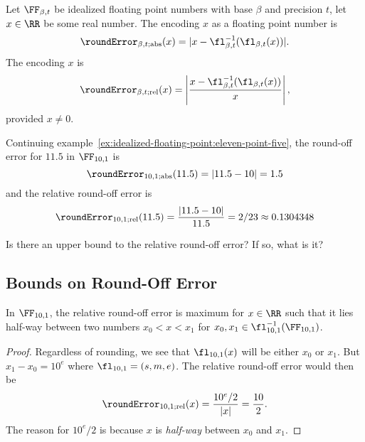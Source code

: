\begin{defn}\label{defn:round-off-error}
Let $\FF_{\beta,t}$ be idealized floating point numbers with base
$\beta$ and precision $t$, let $x\in\RR$ be some real number. The
 encoding $x$ as a floating point number is
\begin{equation}
\roundError_{\beta,t;\text{abs}}(x) = |x - \fl_{\beta,t}^{-1}(\fl_{\beta,t}(x))|.
\end{equation}
The  encoding $x$ is
\begin{equation}
\roundError_{\beta,t;\text{rel}}(x) = \left|\frac{x - \fl_{\beta,t}^{-1}(\fl_{\beta,t}(x))}{x}\right|,
\end{equation}
provided $x\neq0$.
\end{defn}

\begin{ex}
  Continuing
  example~\ref{ex:idealized-floating-point:eleven-point-five},
  the round-off error for $11.5$ in $\FF_{10,1}$ is
  \begin{equation}
    \roundError_{10,1;\text{abs}}(11.5) = |11.5 - 10| = 1.5
  \end{equation}
  and the relative round-off error is
  \begin{equation}
    \roundError_{10,1;\text{rel}}(11.5) = \frac{|11.5 - 10|}{11.5} = 2/23\approx 0.1304348
  \end{equation}
\end{ex}

\begin{puzzle}
Is there an upper bound to the relative round-off error? If so, what is it?
\end{puzzle}

\subsection{Bounds on Round-Off Error}


\begin{lemma}
In $\FF_{10,1}$, the relative round-off error is maximum for $x\in\RR$
such that it lies half-way between two numbers $x_{0}<x<x_{1}$ for
$x_{0},x_{1}\in\fl_{10,1}^{-1}(\FF_{10,1})$.
\end{lemma}
\begin{proof}
Regardless of rounding, we see that $\fl_{10,1}(x)$ will be either
$x_{0}$ or $x_{1}$. But $x_{1}-x_{0}=10^{e}$ where $\fl_{10,1}=(s,m,e)$.
The relative round-off error would then be
\begin{equation}
  \roundError_{10,1;\text{rel}}(x) = \frac{10^{e}/2}{|x|} = \frac{10}{2}.
\end{equation}
The reason for $10^{e}/2$ is because $x$ is \emph{half-way} between
$x_{0}$ and $x_{1}$.
\end{proof}

